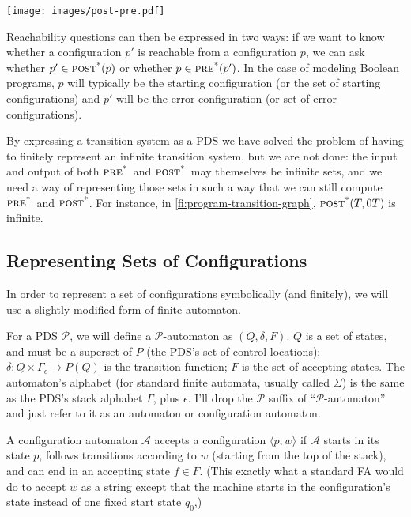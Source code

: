 \documentclass{article}
\newcommand{\Config}[2]{\ensuremath{\langle #1, #2 \rangle}}
\newcommand{\powerset}[1]{P(#1)}
\newcommand{\poststar}{\ensuremath{\textsc{post}^\textsc{*}}}
\newcommand{\prestar}{\ensuremath{\textsc{pre}^\textsc{*}}}
\begin{document}
\begin{center}
  \texttt{[image: images/post-pre.pdf]}
\end{center}

Reachability questions can then be expressed in two ways: if we want
to know whether a configuration $p'$ is reachable from a configuration
$p$, we can ask whether $p' \in \poststar(p)$ or whether $p \in
\prestar(p')$. In the case of modeling Boolean programs, $p$ will
typically be the starting configuration (or the set of starting
configurations) and $p'$ will be the error configuration (or set of
error configurations).

By expressing a transition system as a PDS we have solved the problem
of having to finitely represent an infinite transition system, but we
are not done: the input and output of both \prestar\ and
\poststar\ may themselves be infinite sets, and we need a way of
representing those sets in such a way that we can still compute
\prestar\ and \poststar. For instance, in
\cref{fi:program-transition-graph}, $\poststar(T,0T)$ is infinite.

\subsection{Representing Sets of Configurations}

In order to represent a set of configurations symbolically (and
finitely), we will use a slightly-modified form of finite
automaton.

For a PDS $\mathcal{P}$, we will define a $\mathcal{P}$-automaton as
$(Q, \delta, F)$. $Q$ is a set of states, and must be a superset of
$P$ (the PDS's set of control locations); $\delta: Q \times
\Gamma_\epsilon \rightarrow \powerset{Q}$ is the transition function;
$F$ is the set of accepting states. The automaton's alphabet (for
standard finite automata, usually called $\Sigma$) is the same as the
PDS's stack alphabet $\Gamma$, plus $\epsilon$. I'll drop the
$\mathcal{P}$ suffix of ``$\mathcal{P}$-automaton'' and just refer to
it as an automaton or configuration automaton.

A configuration automaton $\mathcal{A}$ accepts a configuration
\Config{p}{w} if $\mathcal{A}$ starts in its state $p$, follows
transitions according to $w$ (starting from the top of the stack), and
can end in an accepting state $f \in F$. (This exactly what a standard
FA would do to accept $w$ as a string except that the machine starts
in the configuration's state instead of one fixed start state $q_0$,)
\end{document}

